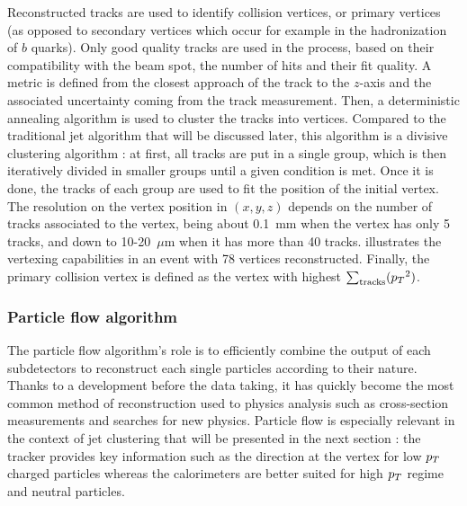         Reconstructed tracks are used to identify collision vertices, or primary vertices
        (as opposed to secondary vertices which occur for example in the hadronization of $b$ quarks).
        Only good quality tracks are used in the process, based on their
        compatibility with the beam spot, the number of hits and their fit quality. A
        metric is defined from the closest approach of the track to the $z$-axis and
        the associated uncertainty coming from the track measurement. Then, a deterministic
        annealing algorithm is used to cluster the tracks into vertices. Compared to the
        traditional jet algorithm that will be discussed later, this algorithm is a divisive
        clustering algorithm : at first, all tracks are put in a single group, which is then
        iteratively divided in smaller groups until a given condition is met. Once it is
        done, the tracks of each group are used to fit the position of the initial vertex.
        The resolution on the vertex position in $(x,y,z)$ depends on the number of tracks
        associated to the vertex, being about 0.1~mm when the vertex has only 5 tracks, and
        down to 10-20~$\mu$m when it has more than 40 tracks. 
        illustrates the vertexing capabilities in an event with 78 vertices reconstructed.
        Finally, the primary collision vertex is defined as the vertex with highest
        $\sum_\text{tracks} ({p_T}^2)$.


            \subsubsection{Particle flow algorithm}



        The particle flow algorithm's role is to efficiently combine the output of each
        subdetectors to reconstruct each single particles according to their nature. Thanks
        to a development before the data taking, it has quickly become the most common
        method of reconstruction used to physics analysis such as cross-section measurements
        and searches for new physics. Particle flow is especially relevant in the context
        of jet clustering that will be presented in the next section : the tracker provides
        key information such as the direction at the vertex for low $p_T$ charged particles
        whereas the calorimeters are better suited for high $p_T$ regime and neutral particles.

